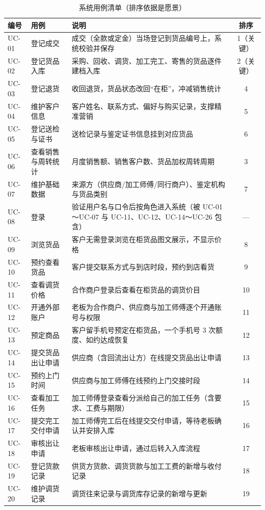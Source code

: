 \documentclass[12pt, a4paper]{ctexart}
\begin{document}
\begin{table}[H]
\centering
\small
\caption{系统用例清单（排序依据是愿景）}
\begin{tabularx}{\textwidth}{@{}l l X c@{}}
\toprule
编号 & 用例 & 说明 & 排序 \\
\midrule
UC-01 & 登记成交 & 成交（全款或定金）当场登记到货品编号上，系统校验并保存 & 1（关键） \\
UC-02 & 登记货品入库 & 采购、回收、调货、加工完工、寄售的货品逐件建档入库 & 2（关键） \\
UC-03 & 登记退货 & 收回退货，货品状态改回“在柜”，冲减销售统计 & 4 \\
UC-04 & 维护客户信息 & 客户姓名、联系方式、偏好与购买记录，支撑精准营销 & 5 \\
UC-05 & 登记送检与证书 & 送检记录与鉴定证书信息挂到对应货品 & 6 \\
UC-06 & 查看销售与周转统计 & 月度销售额、销售客户数、货品加权周转周期 & 3 \\
UC-07 & 维护基础数据 & 来源方（供应商/加工师傅/同行商户）、鉴定机构与货品类别 & 7 \\
UC-08 & 登录 & 验证用户名与口令后按角色进入系统（被 UC-01～UC-07 与 UC-11、UC-12、UC-14～UC-26 包含） & — \\
UC-09 & 浏览货品 & 客户无需登录浏览在柜货品图文展示，不显示价格 & 8 \\
UC-10 & 预约查看货品 & 客户提交联系方式与到店时段，预约到店看货 & 9 \\
UC-11 & 查看调货价格 & 合作商户登录后查看在柜货品的调货价目 & 10 \\
UC-12 & 开通外部账户 & 老板为合作商户、供应商与加工师傅逐个开通账号与权限 & 11 \\
UC-13 & 预定商品 & 客户留手机号预定在柜货品，一个手机号 3 次额度、如约达成恢复 & 12 \\
UC-14 & 提交货品出让申请 & 供应商（含回流出让方）在线提交货品出让申请 & 13 \\
UC-15 & 预约上门时间 & 供应商与加工师傅在线预约上门交接时段 & 14 \\
UC-16 & 查看加工任务 & 加工师傅登录查看分派给自己的加工任务（含要求、工费与期限） & 15 \\
UC-17 & 提交完工交付申请 & 加工师傅完工后在线提交交付申请，等待老板确认并安排入库 & 16 \\
UC-18 & 审核出让申请 & 老板审核出让申请，通过后转入入库流程 & 17 \\
UC-19 & 登记货款记录 & 供货方货款、调货货款与加工工费的新增与收付记录 & 18 \\
UC-20 & 维护调货记录 & 调货往来记录与调货库存记录的新增与更新 & 19 \\

\end{tabularx}
\end{table}
\end{document}
